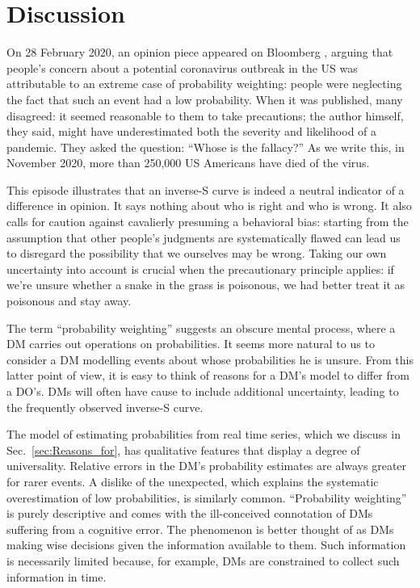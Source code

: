 \documentclass[a4paper, 12pt]{article}
\newcommand{\secref}[1]{Sec.~\ref{sec:#1}}
\begin{document}
\section{Discussion}

On 28 February 2020, an opinion piece appeared on Bloomberg \textcite{Sunstein2020}, arguing that
people's concern about a potential coronavirus outbreak in the US was attributable to an extreme case of probability weighting: people were neglecting the fact that such an event had a low probability. When it was published, many disagreed: it seemed reasonable to them to take precautions; the author himself, they said, might have underestimated both the severity and likelihood of a pandemic. They asked the \textcite{Cohen1979a} question: ``Whose is the fallacy?''
As we write this, in November 2020, more than 250,000 US Americans have died of the virus.

This episode illustrates that an inverse-S curve is indeed a neutral indicator of a difference in opinion. 
It says nothing about who is right and who is wrong. 
It also calls for caution against cavalierly presuming a behavioral bias: starting from the assumption that other people's judgments are systematically flawed can lead us to disregard the possibility that we ourselves may be wrong. Taking our own uncertainty into account is crucial when the precautionary principle applies: if we're unsure whether a snake in the grass is poisonous, we had better treat it as poisonous and stay away.

The term ``probability weighting'' suggests an obscure mental process, where a DM carries out operations on probabilities. It seems more natural to us to consider a DM modelling events about whose probabilities he is unsure. From this latter point of view, it is easy to think of reasons for a DM's model to differ from a DO's. DMs will often have cause to include additional uncertainty, leading to the frequently observed inverse-S curve.

The model of estimating probabilities from real time series, which we discuss in \secref{Reasons_for}, has qualitative features that display a degree of universality. Relative errors in the DM's probability estimates are always greater for rarer events. A dislike of the unexpected, which explains the systematic overestimation of low probabilities, is similarly common. ``Probability weighting'' is purely descriptive and comes with the ill-conceived connotation of DMs suffering from a cognitive error. The phenomenon is better thought of as DMs making wise decisions given the information available to them. Such information is necessarily limited because, for example, DMs are constrained to collect such information in time.
\end{document}
